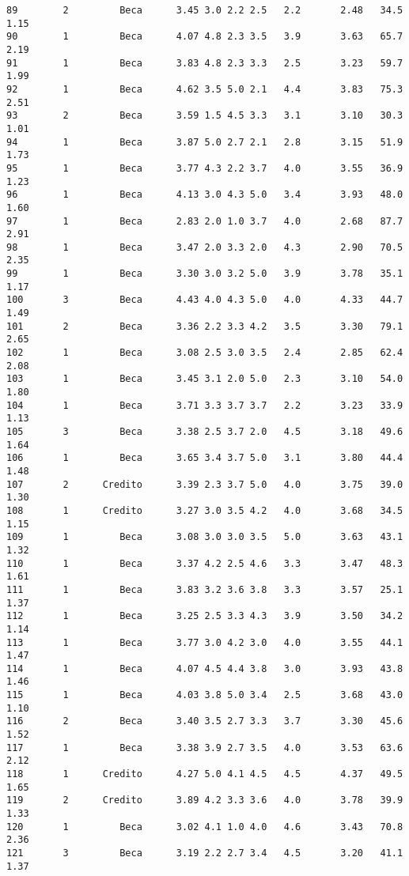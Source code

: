 \documentclass[
  letterpaper,
  DIV=11,
  numbers=noendperiod]{scrartcl}
\begin{document}
\begin{verbatim}
89        2         Beca      3.45 3.0 2.2 2.5   2.2       2.48   34.5    1.15
90        1         Beca      4.07 4.8 2.3 3.5   3.9       3.63   65.7    2.19
91        1         Beca      3.83 4.8 2.3 3.3   2.5       3.23   59.7    1.99
92        1         Beca      4.62 3.5 5.0 2.1   4.4       3.83   75.3    2.51
93        2         Beca      3.59 1.5 4.5 3.3   3.1       3.10   30.3    1.01
94        1         Beca      3.87 5.0 2.7 2.1   2.8       3.15   51.9    1.73
95        1         Beca      3.77 4.3 2.2 3.7   4.0       3.55   36.9    1.23
96        1         Beca      4.13 3.0 4.3 5.0   3.4       3.93   48.0    1.60
97        1         Beca      2.83 2.0 1.0 3.7   4.0       2.68   87.7    2.91
98        1         Beca      3.47 2.0 3.3 2.0   4.3       2.90   70.5    2.35
99        1         Beca      3.30 3.0 3.2 5.0   3.9       3.78   35.1    1.17
100       3         Beca      4.43 4.0 4.3 5.0   4.0       4.33   44.7    1.49
101       2         Beca      3.36 2.2 3.3 4.2   3.5       3.30   79.1    2.65
102       1         Beca      3.08 2.5 3.0 3.5   2.4       2.85   62.4    2.08
103       1         Beca      3.45 3.1 2.0 5.0   2.3       3.10   54.0    1.80
104       1         Beca      3.71 3.3 3.7 3.7   2.2       3.23   33.9    1.13
105       3         Beca      3.38 2.5 3.7 2.0   4.5       3.18   49.6    1.64
106       1         Beca      3.65 3.4 3.7 5.0   3.1       3.80   44.4    1.48
107       2      Credito      3.39 2.3 3.7 5.0   4.0       3.75   39.0    1.30
108       1      Credito      3.27 3.0 3.5 4.2   4.0       3.68   34.5    1.15
109       1         Beca      3.08 3.0 3.0 3.5   5.0       3.63   43.1    1.32
110       1         Beca      3.37 4.2 2.5 4.6   3.3       3.47   48.3    1.61
111       1         Beca      3.83 3.2 3.6 3.8   3.3       3.57   25.1    1.37
112       1         Beca      3.25 2.5 3.3 4.3   3.9       3.50   34.2    1.14
113       1         Beca      3.77 3.0 4.2 3.0   4.0       3.55   44.1    1.47
114       1         Beca      4.07 4.5 4.4 3.8   3.0       3.93   43.8    1.46
115       1         Beca      4.03 3.8 5.0 3.4   2.5       3.68   43.0    1.10
116       2         Beca      3.40 3.5 2.7 3.3   3.7       3.30   45.6    1.52
117       1         Beca      3.38 3.9 2.7 3.5   4.0       3.53   63.6    2.12
118       1      Credito      4.27 5.0 4.1 4.5   4.5       4.37   49.5    1.65
119       2      Credito      3.89 4.2 3.3 3.6   4.0       3.78   39.9    1.33
120       1         Beca      3.02 4.1 1.0 4.0   4.6       3.43   70.8    2.36
121       3         Beca      3.19 2.2 2.7 3.4   4.5       3.20   41.1    1.37

\end{verbatim}
\end{document}
